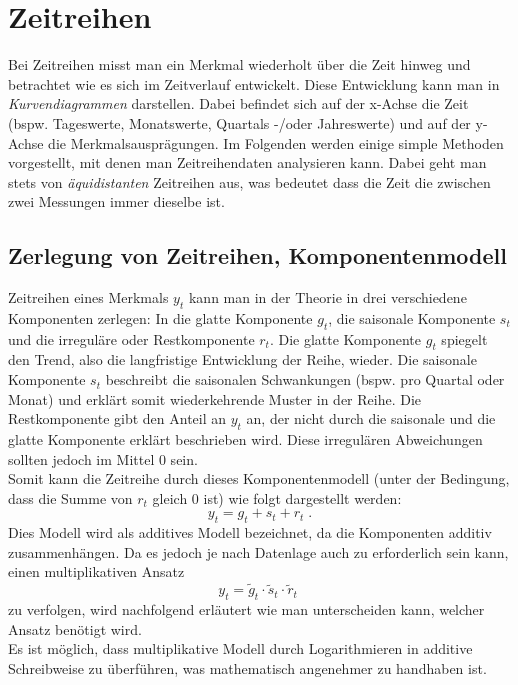 \documentclass[a4paper]{article}
\newcommand\dangersign[1][2ex]{%
  \renewcommand\stacktype{L}%
  \scaleto{\stackon[1.3pt]{\color{red}$\triangle$}{\tiny !}}{#1}%
}
\begin{document}
\clearpage


\section{Zeitreihen}
Bei Zeitreihen misst man ein Merkmal wiederholt über die Zeit hinweg und betrachtet wie es sich im Zeitverlauf entwickelt. Diese Entwicklung kann man in \textit{Kurvendiagrammen} darstellen. Dabei befindet sich auf der x-Achse die Zeit (bspw. Tageswerte, Monatswerte, Quartals -/oder Jahreswerte) und auf der y-Achse die Merkmalsausprägungen. Im Folgenden werden einige simple Methoden vorgestellt, mit denen man Zeitreihendaten analysieren kann. Dabei geht man stets von \textit{äquidistanten} Zeitreihen aus, was bedeutet dass die Zeit die zwischen zwei Messungen immer dieselbe ist.

\subsection{Zerlegung von Zeitreihen, Komponentenmodell}
Zeitreihen eines Merkmals $y_t$ kann man in der Theorie in drei verschiedene Komponenten zerlegen: In die glatte Komponente $g_t$, die saisonale Komponente $s_t$ und die irreguläre oder Restkomponente $r_t$. Die glatte Komponente $g_t$ spiegelt den Trend, also die langfristige Entwicklung der Reihe, wieder. Die saisonale Komponente $s_t$ beschreibt die saisonalen Schwankungen (bspw. pro Quartal oder Monat) und erklärt somit wiederkehrende Muster in der Reihe. Die Restkomponente gibt den Anteil an $y_t$ an, der nicht durch die saisonale und die glatte Komponente erklärt beschrieben wird. Diese irregulären Abweichungen sollten jedoch im Mittel 0 sein.\\
Somit kann die Zeitreihe durch dieses Komponentenmodell (unter der Bedingung, dass die Summe von $r_t$ gleich 0 ist) wie folgt dargestellt werden: 
$$y_t=g_t+s_t+r_t\;.$$
\noindent Dies Modell wird als additives Modell bezeichnet, da die Komponenten additiv zusammenhängen. Da es jedoch je nach Datenlage auch zu erforderlich sein kann, einen multiplikativen Ansatz
$$y_t = \tilde g_t \cdot \tilde s_t \cdot \tilde r_t\;$$
zu verfolgen, wird nachfolgend erläutert wie man unterscheiden kann, welcher Ansatz benötigt wird.\\

\noindent \dangersign[3ex] Es ist möglich, dass multiplikative Modell durch Logarithmieren in additive Schreibweise zu überführen, was mathematisch angenehmer zu handhaben ist.\\
\end{document}
